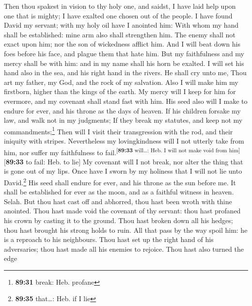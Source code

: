  Then thou spakest in vision to thy holy one, and saidst,
I have laid help upon one that is mighty; I have exalted one chosen out
of the people.  I have found David my servant; with my
holy oil have I anointed him:  With whom my hand shall be
established: mine arm also shall strengthen him.  The
enemy shall not exact upon him; nor the son of wickedness afflict him.
 And I will beat down his foes before his face, and
plague them that hate him.  But my faithfulness and my
mercy shall be with him: and in my name shall his horn be exalted.
 I will set his hand also in the sea, and his right hand
in the rivers.  He shall cry unto me, Thou art my father,
my God, and the rock of my salvation.  Also I will make
him my firstborn, higher than the kings of the earth.  My
mercy will I keep for him for evermore, and my covenant shall stand fast
with him.  His seed also will I make to endure for ever,
and his throne as the days of heaven.  If his children
forsake my law, and walk not in my judgments;  If they
break my statutes, and keep not my commandments;\footnote{\textbf{89:31}
  break: Heb. profane}  Then will I visit their
transgression with the rod, and their iniquity with stripes.
 Nevertheless my lovingkindness will I not utterly take
from him, nor suffer my faithfulness to
fail.\textsuperscript{{[}\textbf{89:33} will\ldots: Heb. I will not make
void from him{]}}{[}\textbf{89:33} to fail: Heb. to lie{]}
 My covenant will I not break, nor alter the thing that
is gone out of my lips.  Once have I sworn by my holiness
that I will not lie unto David.\footnote{\textbf{89:35} that\ldots: Heb.
  if I lie}  His seed shall endure for ever, and his
throne as the sun before me.  It shall be established for
ever as the moon, and as a faithful witness in heaven. Selah.
 But thou hast cast off and abhorred, thou hast been
wroth with thine anointed.  Thou hast made void the
covenant of thy servant: thou hast profaned his crown by casting it to
the ground.  Thou hast broken down all his hedges; thou
hast brought his strong holds to ruin.  All that pass by
the way spoil him: he is a reproach to his neighbours. 
Thou hast set up the right hand of his adversaries; thou hast made all
his enemies to rejoice.  Thou hast also turned the edge
